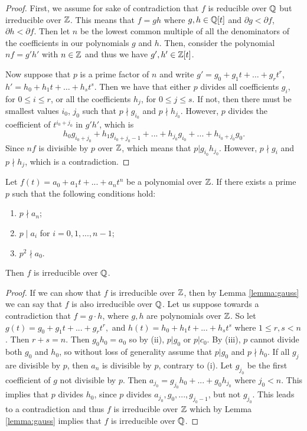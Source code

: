 \begin{proof}

First, we assume for sake of contradiction that $f$ is reducible over $\mathbb Q$ but irreducible over $\mathbb Z$. This means that $f=gh$ where $g,h \in \mathbb Q[t]$ and $\partial g < \partial f$, $\partial h < \partial f$. Then let $n$ be the lowest common multiple of all the denominators of the coefficients in our polynomials $g$ and $h$. Then, consider the polynomial $nf = g' h'$ with $n \in \mathbb Z$ and thus we have $g', h' \in \mathbb Z[t]$. 

Now suppose that $p$ is a prime factor of $n$ and write $g' = g_0 + g_1 t +\dots+ g_r t^r$, $h' = h_0 + h_1 t +\dots+ h_s t^s$. Then we have that either $p$ divides all coefficients $g_i$, for $0\leq i\leq r$, or all the coefficients $h_j$, for $0\leq j \leq s$. If not, then there must be smallest values $i_0$, $j_0$ such that $p \nmid g_{i_0}$ and $p \nmid h_{j_0}$. However, $p$ divides the coefficient of $t^{i_0+j_0}$ in $g' h'$, which is
$$
h_0 g_{i_0+j_0} + h_1 g_{i_0+j_0-1} +...+ h_{j_0} g_{i_0} +...+ h_{i_0+j_0} g_0.
$$
Since $nf$ is divisible by $p$ over $\mathbb Z$, which means that $p |g_{i_0} h_{j_0}$. However, $p \nmid g_i$ and $p \nmid h_j$, which is a contradiction.
\end{proof}

\begin{theorem} \label{thm:eisenstein}
    Let
    $f(t) = a_0 + a_1 t + ... + a_n t^n$
    be a polynomial over $\mathbb Z$. 
    If there exists a prime $p$ such that the following conditions hold:
    \begin{enumerate}[label=(\roman*)]
        \item $p \nmid a_n$;
        \item $p \mid a_i$ for $i = {0, 1,..., n-1}$;
        \item $p^2 \nmid a_0$. 
    \end{enumerate}
    Then $f$ is irreducible over $\mathbb Q$. 
\end{theorem}

\begin{proof}
If we can show that $f$ is irreducible over $\mathbb Z$, then by Lemma \ref{lemma:gauss} we can say that $f$ is also irreducible over $\mathbb Q$.
Let us suppose towards a contradiction that $f=g \cdot h$, where $g,h$ are polynomials over $\mathbb Z$. So let $g(t)=g_0+g_1 t+ ... +g_r t^r,$ and $h(t)=h_0+h_1t+ ... +h_st^s$ where $1 \leq r, s < n$. Then $r+s=n$. Then $g_0 h_0 = a_0$ so by (ii), $p|g_0$ or $p|c_0$. By (iii), $p$ cannot divide both $g_0$ and $h_0$, so without loss of generality assume that $p | g_0$ and $p \nmid h_0$. If all $g_j$ are divisible by $p$, then $a_n$ is divisible by $p$, contrary to (i). Let $g_{j_0}$ be the first coefficient of $g$ not divisible by $p$. Then
$
a_{j_0} = g_{j_0} h_0 + ...+ g_0 h_{j_0}
$
where $j_0 < n$. This implies that $p$ divides $h_0$, since $p$ divides $a_{j_0}, g_0,..., g_{j_0-1}$, but not $g_{j_0}$. This leads to a contradiction and thus $f$ is irreducible over $\mathbb Z$ which by Lemma \ref{lemma:gauss} implies that $f$ is irreducible over $\mathbb Q$.
\end{proof}

